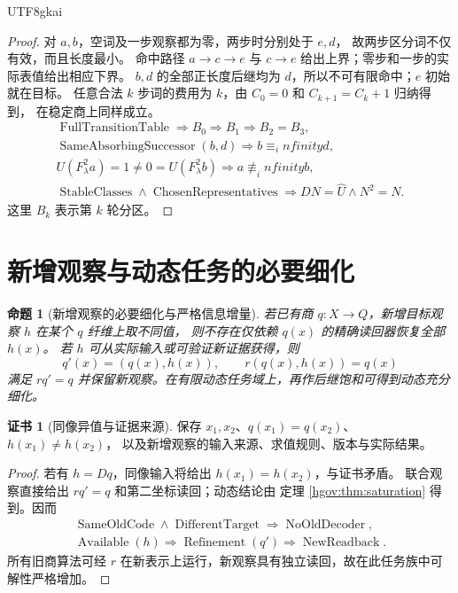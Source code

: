 \documentclass[12pt,a4paper,openany,notitlepage]{report}
\theoremstyle{plain}
\newtheorem{proposition}[theorem]{命题}
\theoremstyle{definition}
\newtheorem*{certificate}{证书}
\theoremstyle{remark}
\def\mathcal#1{#1}\def\mathsf#1{#1}\def\mathbb#1{#1}%
\def\infty{infinity}\def\Gamma{Gamma}\def\Phi{Phi}%
\begin{document}
\begin{CJK*}{UTF8}{gkai}
\begin{proof}
对 $a,b$，空词及一步观察都为零，两步时分别处于 $e,d$，
故两步区分词不仅有效，而且长度最小。
命中路径 $a\to c\to e$ 与 $c\to e$ 给出上界；零步和一步的实际表值给出相应下界。
$b,d$ 的全部正长度后继均为 $d$，所以不可有限命中；$e$ 初始就在目标。
任意合法 $k$ 步词的费用为 $k$，由 $C_0=0$ 和 $C_{k+1}=C_k+1$ 归纳得到，
在稳定商上同样成立。
\[
\begin{gathered}
 \operatorname{FullTransitionTable}
 \Rightarrow\mathcal B_0\Rightarrow\mathcal B_1\Rightarrow\mathcal B_2=\mathcal B_3,\\
 \operatorname{SameAbsorbingSuccessor}(b,d)
 \Rightarrow b\equiv_\infty d,\\
 U(F_\lambda^2a)=1\ne0=U(F_\lambda^2b)
 \Rightarrow a\not\equiv_\infty b,\\
 \operatorname{StableClasses}\land\operatorname{ChosenRepresentatives}
 \Rightarrow DN=\widehat U\land N^2=N.
\end{gathered}
\]
这里 $\mathcal B_k$ 表示第 $k$ 轮分区。
\end{proof}

\section{新增观察与动态任务的必要细化}
\label{exp:gov:new-observation-section}

\begin{proposition}[新增观察的必要细化与严格信息增量]
\label{hgov:prop:refine}
若已有商 $q:X\to Q$，新增目标观察 $h$ 在某个 $q$ 纤维上取不同值，
则不存在仅依赖 $q(x)$ 的精确读回器恢复全部 $h(x)$。
若 $h$ 可从实际输入或可验证新证据获得，则
\[
q'(x)=(q(x),h(x)),\qquad r(q(x),h(x))=q(x)
\]
满足 $rq'=q$ 并保留新观察。在有限动态任务域上，再作后继饱和可得到动态充分细化。
\end{proposition}
\begin{certificate}[同像异值与证据来源]
保存 $x_1,x_2$、$q(x_1)=q(x_2)$、$h(x_1)\ne h(x_2)$，
以及新增观察的输入来源、求值规则、版本与实际结果。
\end{certificate}
\begin{proof}
若有 $h=Dq$，同像输入将给出 $h(x_1)=h(x_2)$，与证书矛盾。
联合观察直接给出 $rq'=q$ 和第二坐标读回；动态结论由
定理 \ref{hgov:thm:saturation} 得到。因而
\[
\begin{gathered}
\operatorname{SameOldCode}\land\operatorname{DifferentTarget}
\Rightarrow\operatorname{NoOldDecoder},\\
\operatorname{Available}(h)\Rightarrow\operatorname{Refinement}(q')
\Rightarrow\operatorname{NewReadback}.
\end{gathered}
\]
所有旧商算法可经 $r$ 在新表示上运行，新观察具有独立读回，故在此任务族中可解性严格增加。
\end{proof}


\end{CJK*}
\end{document}
